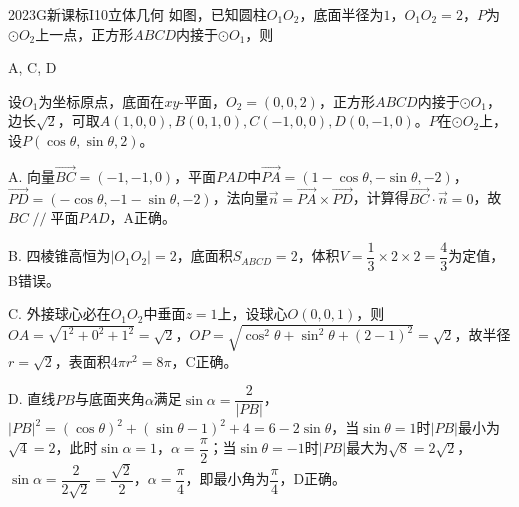 
\begin{problem}{2023}{G}{新课标I}{10}{立体几何}
如图，已知圆柱$O_1O_2$，底面半径为$1$，$O_1O_2=2$，$P$为$\odot O_2$上一点，正方形$ABCD$内接于$\odot O_1$，则
\begin{choices}
\end{choices}
\end{problem}

\begin{answer}
A, C, D
\end{answer}

\begin{solutions}
设$O_1$为坐标原点，底面在$xy$-平面，$O_2=(0,0,2)$，正方形$ABCD$内接于$\odot O_1$，边长$\sqrt{2}$，可取$A(1,0,0),B(0,1,0),C(-1,0,0),D(0,-1,0)$。$P$在$\odot O_2$上，设$P(\cos\theta,\sin\theta,2)$。

A. 向量$\overrightarrow{BC}=(-1,-1,0)$，平面$PAD$中$\overrightarrow{PA}=(1-\cos\theta,-\sin\theta,-2)$，$\overrightarrow{PD}=(-\cos\theta,-1-\sin\theta,-2)$，法向量$\vec{n}=\overrightarrow{PA}\times\overrightarrow{PD}$，计算得$\overrightarrow{BC}\cdot\vec{n}=0$，故$BC\mathop{//}$平面$PAD$，A正确。

B. 四棱锥高恒为$|O_1O_2|=2$，底面积$S_{ABCD}=2$，体积$V=\dfrac{1}{3}\times2\times2=\dfrac{4}{3}$为定值，B错误。

C. 外接球心必在$O_1O_2$中垂面$z=1$上，设球心$O(0,0,1)$，则$OA=\sqrt{1^2+0^2+1^2}=\sqrt{2}$，$OP=\sqrt{\cos^2\theta+\sin^2\theta+(2-1)^2}=\sqrt{2}$，故半径$r=\sqrt{2}$，表面积$4\pi r^2=8\pi$，C正确。

D. 直线$PB$与底面夹角$\alpha$满足$\sin\alpha=\dfrac{2}{|PB|}$，$|PB|^2=(\cos\theta)^2+(\sin\theta-1)^2+4=6-2\sin\theta$，当$\sin\theta=1$时$|PB|$最小为$\sqrt{4}=2$，此时$\sin\alpha=1$，$\alpha=\dfrac{\pi}{2}$；当$\sin\theta=-1$时$|PB|$最大为$\sqrt{8}=2\sqrt{2}$，$\sin\alpha=\dfrac{2}{2\sqrt{2}}=\dfrac{\sqrt{2}}{2}$，$\alpha=\dfrac{\pi}{4}$，即最小角为$\dfrac{\pi}{4}$，D正确。
\end{solutions}